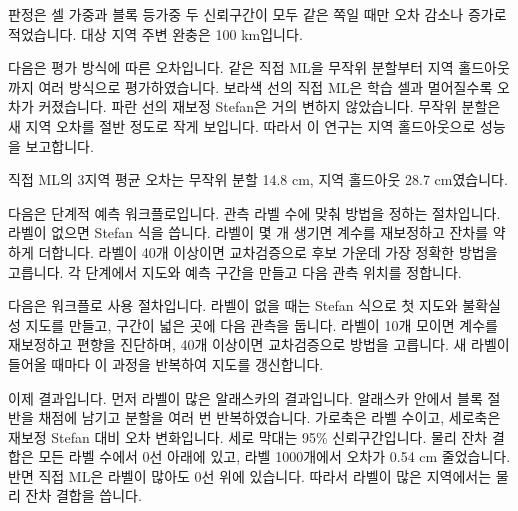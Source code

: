 
\begin{optbox}
판정은 셀 가중과 블록 등가중 두 신뢰구간이 모두 같은 쪽일 때만 오차 감소나 증가로 적었습니다. 대상 지역 주변 완충은 100 km입니다.
\end{optbox}


다음은 평가 방식에 따른 오차입니다. 같은 직접 ML을 무작위 분할부터 지역 홀드아웃까지 여러 방식으로 평가하였습니다. 보라색 선의 직접 ML은 학습 셀과 멀어질수록 오차가 커졌습니다. 파란 선의 재보정 Stefan은 거의 변하지 않았습니다. 무작위 분할은 새 지역 오차를 절반 정도로 작게 보입니다. 따라서 이 연구는 지역 홀드아웃으로 성능을 보고합니다.


\begin{optbox}
직접 ML의 3지역 평균 오차는 무작위 분할 14.8 cm, 지역 홀드아웃 28.7 cm였습니다.
\end{optbox}


다음은 단계적 예측 워크플로입니다. 관측 라벨 수에 맞춰 방법을 정하는 절차입니다. 라벨이 없으면 Stefan 식을 씁니다. 라벨이 몇 개 생기면 계수를 재보정하고 잔차를 약하게 더합니다. 라벨이 40개 이상이면 교차검증으로 후보 가운데 가장 정확한 방법을 고릅니다. 각 단계에서 지도와 예측 구간을 만들고 다음 관측 위치를 정합니다.



다음은 워크플로 사용 절차입니다. 라벨이 없을 때는 Stefan 식으로 첫 지도와 불확실성 지도를 만들고, 구간이 넓은 곳에 다음 관측을 둡니다. 라벨이 10개 모이면 계수를 재보정하고 편향을 진단하며, 40개 이상이면 교차검증으로 방법을 고릅니다. 새 라벨이 들어올 때마다 이 과정을 반복하여 지도를 갱신합니다.



이제 결과입니다. 먼저 라벨이 많은 알래스카의 결과입니다. 알래스카 안에서 블록 절반을 채점에 남기고 분할을 여러 번 반복하였습니다. 가로축은 라벨 수이고, 세로축은 재보정 Stefan 대비 오차 변화입니다. 세로 막대는 95\% 신뢰구간입니다. 물리 잔차 결합은 모든 라벨 수에서 0선 아래에 있고, 라벨 1000개에서 오차가 0.54 cm 줄었습니다. 반면 직접 ML은 라벨이 많아도 0선 위에 있습니다. 따라서 라벨이 많은 지역에서는 물리 잔차 결합을 씁니다.

